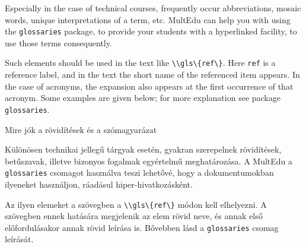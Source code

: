 




{
Especially in the case of technical courses, frequently occur abbreviations, mosaic words, unique interpretations of a term, etc. \gls{MultEdu} can help you
with using the \lstinline|glossaries| package, to provide your students 
with a hyperlinked facility, to use those terms consequently.

Such elements should be used in the text like \lstinline|\\gls\{ref\}|.
Here \lstinline|ref| is a reference label, and in the text the short 
name of the referenced item appears. In the case of acronyms, the 
expansion also appears at the first occurrence of that acronym.
Some examples are given below; for more explanation see package \lstinline|glossaries|.

}
{Mire jók a rövidítések és a szómagyarázat}
{

Különösen technikai jellegű tárgyak esetén, gyakran szerepelnek 
rövidítések, betűszavak, illetve bizonyos fogalmak egyértelmű meghatározása.
A \gls{MultEdu} a \lstinline|glossaries| csomagot használva teszi lehetővé,
hogy a dokumentumokban ilyeneket használjon, ráadásul hiper-hivatkozásként.
 
Az ilyen elemeket a szövegben  a \lstinline|\\gls\{ref\}| módon kell elhelyezni.
A szövegben ennek hatására megjelenik az elem rövid neve, és annak első
előfordulásakor annak rövid leírása is. Bővebben lásd a \lstinline|glossaries| 
csomag leírását.
}

